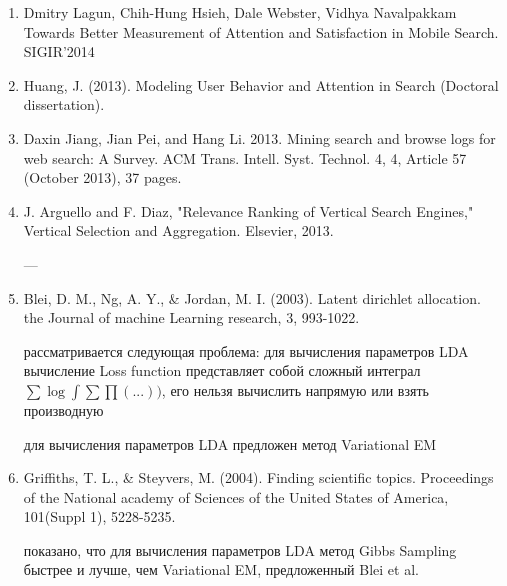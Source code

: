\documentclass[12pt,a4paper]{article}
\begin{document}
\begin{enumerate}
\item Dmitry Lagun, Chih-Hung Hsieh, Dale Webster, Vidhya Navalpakkam Towards Better Measurement of Attention and Satisfaction in Mobile Search. SIGIR'2014

\item Huang, J. (2013). Modeling User Behavior and Attention in Search (Doctoral dissertation).

\item Daxin Jiang, Jian Pei, and Hang Li. 2013. Mining search and browse logs for web search: A Survey. ACM Trans. Intell. Syst. Technol. 4, 4, Article 57 (October 2013), 37 pages.

\item J. Arguello and F. Diaz, "Relevance Ranking of Vertical Search Engines," Vertical Selection and Aggregation. Elsevier, 2013.

---
\item Blei, D. M., Ng, A. Y., \& Jordan, M. I. (2003). Latent dirichlet allocation. the Journal of machine Learning research, 3, 993-1022.

  рассматривается следующая проблема: для вычисления параметров LDA вычисление
  Loss function представляет собой сложный интеграл $\sum \log \int \sum \prod (...))$, его нельзя вычислить напрямую или взять производную

  для вычисления параметров LDA предложен метод Variational EM

\item Griffiths, T. L., \& Steyvers, M. (2004). Finding scientific topics. Proceedings of the National academy of Sciences of the United States of America, 101(Suppl 1), 5228-5235.

  показано, что для вычисления параметров LDA метод Gibbs Sampling быстрее и
  лучше, чем Variational EM, предложенный Blei et al.

\end{enumerate}
\end{document}
